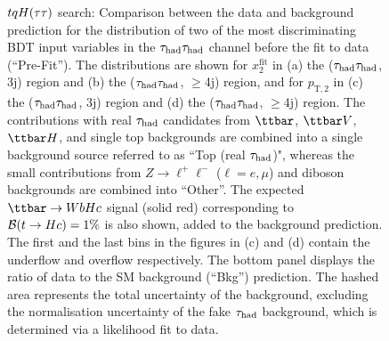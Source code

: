 \begin{figure}[t]
\begin{center}
\caption{$tqH(\tau\tau)$ search: Comparison between the data and background prediction for the distribution of two of the most 
discriminating BDT input variables in the $\tau_{\mathrm{had}} \tau_{\mathrm{had}}$ channel before the fit to data (``Pre-Fit''). The distributions are shown for
$x_{2}^{\text{fit}}$ in (a) the ($\tau_{\mathrm{had}} \tau_{\mathrm{had}}$, 3j) region and (b) the ($\tau_{\mathrm{had}} \tau_{\mathrm{had}}$, $\geq$4j) region, and for
$p_{\text{T},2}$ in (c) the ($\tau_{\mathrm{had}} \tau_{\mathrm{had}}$, 3j)  region and (d) the ($\tau_{\mathrm{had}} \tau_{\mathrm{had}}$, $\geq$4j) region.
The contributions with real $\tau_{\mathrm{had}}$ candidates from $\ttbar$,  $\ttbar V$, $\ttbar H$, and single top backgrounds are combined into
a single background source referred to as ``Top (real $\tau_{\mathrm{had}}$)", whereas the small contributions from 
$Z\to \ell^+\ell^-$ ($\ell = e, \mu$) and diboson backgrounds are combined into ``Other''. 
The expected $\Hc$ signal (solid red) corresponding to $\mathcal{B}(t\to Hc)=1\%$ is also shown,
added to the background prediction.
The first and the last bins in the figures in (c) and (d) contain the underflow and overflow respectively.
The bottom panel displays the ratio of data to the SM background (``Bkg'') prediction.
The hashed area represents the total uncertainty of the background, excluding the normalisation uncertainty of the fake $\tau_{\mathrm{had}}$ background, 
which is determined via a likelihood fit to data.} 
\label{fig:BDT_inputs_hadhad_2}
\end{center}
\end{figure}


